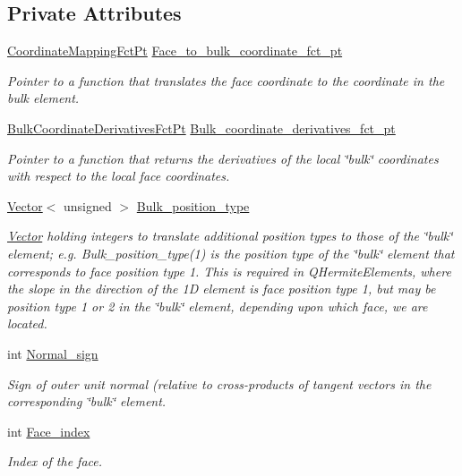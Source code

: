 \subsection*{Private Attributes}
\begin{DoxyCompactItemize}
\item 
\hyperlink{classoomph_1_1FaceElement_aaa3af8b5d2e9584bdcd9b133990d7591}{Coordinate\+Mapping\+Fct\+Pt} \hyperlink{classoomph_1_1FaceElement_ad679fad61e43e7a537df4f7b148f0ebc}{Face\+\_\+to\+\_\+bulk\+\_\+coordinate\+\_\+fct\+\_\+pt}
\begin{DoxyCompactList}\small\item\em Pointer to a function that translates the face coordinate to the coordinate in the bulk element. \end{DoxyCompactList}\item 
\hyperlink{classoomph_1_1FaceElement_a67356b9329923767ab8f13fed85f7f88}{Bulk\+Coordinate\+Derivatives\+Fct\+Pt} \hyperlink{classoomph_1_1FaceElement_a5dc24a15c7486ef1859223ac9dd4c78e}{Bulk\+\_\+coordinate\+\_\+derivatives\+\_\+fct\+\_\+pt}
\begin{DoxyCompactList}\small\item\em Pointer to a function that returns the derivatives of the local \char`\"{}bulk\char`\"{} coordinates with respect to the local face coordinates. \end{DoxyCompactList}\item 
\hyperlink{classoomph_1_1Vector}{Vector}$<$ unsigned $>$ \hyperlink{classoomph_1_1FaceElement_a94b5c274338bd257c0d18b381b216984}{Bulk\+\_\+position\+\_\+type}
\begin{DoxyCompactList}\small\item\em \hyperlink{classoomph_1_1Vector}{Vector} holding integers to translate additional position types to those of the \char`\"{}bulk\char`\"{} element; e.\+g. Bulk\+\_\+position\+\_\+type(1) is the position type of the \char`\"{}bulk\char`\"{} element that corresponds to face position type 1. This is required in Q\+Hermite\+Elements, where the slope in the direction of the 1D element is face position type 1, but may be position type 1 or 2 in the \char`\"{}bulk\char`\"{} element, depending upon which face, we are located. \end{DoxyCompactList}\item 
int \hyperlink{classoomph_1_1FaceElement_a5b72b90a01168c323f57714bb9a27376}{Normal\+\_\+sign}
\begin{DoxyCompactList}\small\item\em Sign of outer unit normal (relative to cross-\/products of tangent vectors in the corresponding \char`\"{}bulk\char`\"{} element. \end{DoxyCompactList}\item 
int \hyperlink{classoomph_1_1FaceElement_a528cd1e95e0c231f757e54b751c50f8f}{Face\+\_\+index}
\begin{DoxyCompactList}\small\item\em Index of the face. \end{DoxyCompactList}\end{DoxyCompactItemize}
